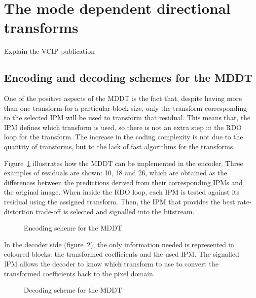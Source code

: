 \documentclass[11pt,a4paper,openright,twoside]{book}
\numberwithin{equation}{section} %
\numberwithin{figure}{section} %
\numberwithin{table}{section} %
\begin{document}
\section{The mode dependent directional transforms}
\label{sec:the_mode_dependent_directional_transforms}

Explain the VCIP publication~\cite{arrufat-14-mddt-rdot}
\subsection{Encoding and decoding schemes for the \ac{MDDT}}
\label{sub:encoding_and_decoding_schemes_for_the_mddt}

One of the positive aspects of the \ac{MDDT} is the fact that, despite having
more than one transform for a particular block size, only the transform
corresponding to the selected \ac{IPM} will be used to transform that
residual.
This means that, the \ac{IPM} defines which transform is used, so there is not
an extra step in the \ac{RDO} loop for the transform.
The increase in the coding complexity is not due to the quantity of
transforms, but to the lack of fast algorithms for the transforms.

Figure~\ref{fig:enc_mddt} illustrates how the \ac{MDDT} can be implemented in
the encoder.
Three examples of residuals are shown: 10, 18 and 26, which are obtained as
the differences between the predictions derived from their corresponding
\acp{IPM} and the original image.
When inside the \ac{RDO} loop, each \ac{IPM} is tested against its residual
using the assigned transform.
Then, the \ac{IPM} that provides the best rate-distortion trade-off is
selected and signalled into the bitstream.

\begin{figure}[tp]
	\centering
	
	\caption{Encoding scheme for the \ac{MDDT}}
	\label{fig:enc_mddt}
\end{figure}

In the decoder side (figure~\ref{fig:dec_mddt}), the only information needed
is represented in coloured blocks: the transformed coefficients and the used
\ac{IPM}.
The signalled \ac{IPM} allows the decoder to know which transform to use to
convert the transformed coefficients back to the pixel domain.

\begin{figure}[tp]
	\centering
	
	\caption{Decoding scheme for the \ac{MDDT}}
	\label{fig:dec_mddt}
\end{figure}
\end{document}
